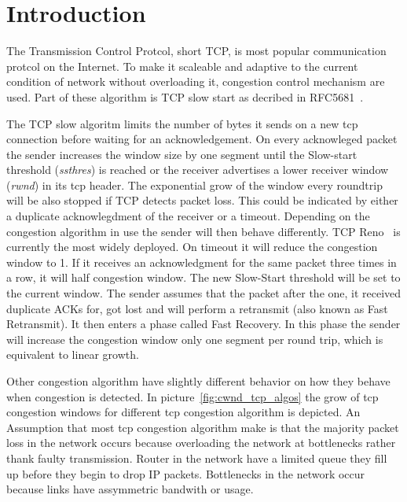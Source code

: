 \section{Introduction}
\label{sec:introduction}

The Transmission Control Protcol, short TCP, is most popular communication
protcol on the Internet. To make it scaleable and adaptive to the current
condition of network without overloading it, congestion control mechanism are
used. Part of these algorithm is TCP slow start as decribed in
RFC5681~\cite{rfc5681}.

The TCP slow algoritm limits the number of bytes it sends on a new tcp
connection before waiting for an acknowledgement. On every acknowleged packet
the sender increases the window size by one segment until the Slow-start
threshold (\emph{ssthres}) is reached  or the receiver advertises a lower
receiver window (\emph{rwnd}) in its tcp header. The exponential grow of the
window every roundtrip will be also stopped if TCP detects packet loss. This
could be indicated by either a duplicate acknowlegdment of the receiver or a
timeout. Depending on the congestion algorithm in use the sender will then
behave differently. TCP Reno~\cite{rfc2581} is currently the most widely
deployed. On timeout it will reduce the congestion window to 1. If it receives
an acknowledgment for the same packet three times in a row, it will half
congestion window. The new Slow-Start threshold will be set to the
current window. The sender assumes that the packet after the one, it received
duplicate ACKs for, got lost and will perform a retransmit (also known as Fast
Retransmit). It then enters a phase called Fast Recovery. In this phase the
sender will increase the congestion window only one segment per round trip,
which is equivalent to linear growth.

Other congestion algorithm have slightly different behavior on how they behave
when congestion is detected. In picture~\ref{fig:cwnd_tcp_algos} the grow of tcp
congestion windows for different tcp congestion algorithm is depicted. An
Assumption that most tcp congestion algorithm make is that the majority packet
loss in the network occurs because overloading the network at bottlenecks rather
thank faulty transmission. Router in the network have a limited queue they fill
up before they begin to drop IP packets. Bottlenecks in the network occur
because links have assymmetric bandwith or usage.

